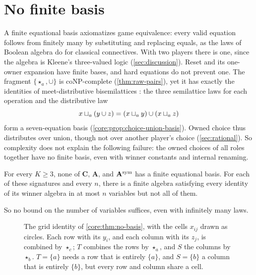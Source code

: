\section{No finite basis}\label{sec:no-basis}

A finite equational basis axiomatizes game equivalence: every valid equation follows from finitely many by substituting and replacing equals, as the laws of Boolean algebra do for classical connectives. With two players there is one, since the algebra is Kleene's three-valued logic (\cref{sec:discussion}). Reset and its one-owner expansion have finite bases, and hard equations do not prevent one. The fragment $\{\star_a,\cup\}$ is coNP-complete (\cref{thm:raw-pairs}), yet it has exactly the identities of meet-distributive bisemilattices \cite{HardingRomanowska2017}: the three semilattice laws for each operation and the distributive law
\[
 x\mathbin{\sqcup_{a}}(y\cup z)=(x\mathbin{\sqcup_{a}} y)\cup(x\mathbin{\sqcup_{a}} z)
\]
form a seven-equation basis (\cref{core:prop:choice-union-basis}). Owned choice thus distributes over union, though not over another player's choice (\cref{sec:rational}). So complexity does not explain the following failure: the owned choices of all roles together have no finite basis, even with winner constants and internal renaming.

\begin{theorem}\label{core:thm:no-basis}
For every $K\geq3$, none of $\mathbf C$, $\mathbf A$, and $\mathbf A^{\rm sym}$ has a finite equational basis. For each of these signatures and every $n$, there is a finite algebra satisfying every identity of its winner algebra in at most $n$ variables but not all of them.
\end{theorem}

So no bound on the number of variables suffices, even with infinitely many laws.

\begin{figure}[htb]
\centering
{}
\caption{The grid identity of \cref{core:thm:no-basis}, with the cells $x_{ij}$ drawn as circles. Each row with its $y_i$, and each column with its $z_j$, is combined by $\star_c$; $T$ combines the rows by $\star_a$, and $S$ the columns by $\star_b$. $T=\{a\}$ needs a row that is entirely $\{a\}$, and $S=\{b\}$ a column that is entirely $\{b\}$, but every row and column share a cell.}
\label{fig:grid}
\end{figure}

